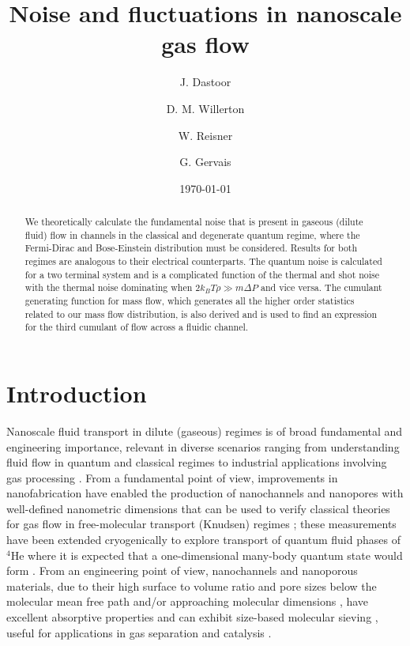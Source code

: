 \documentclass[%
 reprint,
 aps,
 prb,
 epsf,
]{revtex4-2}
\begin{document}
\title{Noise and fluctuations in nanoscale gas flow}%

\author{J. Dastoor}
\author{D. M. Willerton}
\author{W. Reisner}
\author{G. Gervais}


%

\date{\today}

\begin{abstract}
We theoretically calculate the fundamental noise that is present in gaseous (dilute fluid) flow in channels in the classical and degenerate quantum regime, where the Fermi-Dirac and Bose-Einstein distribution must be considered. Results for both regimes are analogous to their electrical counterparts. The quantum noise is calculated for a two terminal system and is a complicated function of the thermal and shot noise with the thermal noise dominating when $2k_BT\rho \gg m\Delta P$ and vice versa. The cumulant generating function for mass flow, which generates all the higher order statistics related to our mass flow distribution, is also derived and is used to find an expression for the third cumulant of flow across a fluidic channel.
\end{abstract}
\maketitle
{}


\section{\label{sec:intro}Introduction}

     Nanoscale fluid transport in dilute (gaseous) regimes is of broad fundamental and engineering importance, relevant in diverse scenarios ranging from understanding fluid flow in quantum and classical regimes to industrial applications involving gas processing \cite{bao}.  From a fundamental point of view, improvements in nanofabrication have enabled the production of nanochannels and nanopores with well-defined nanometric dimensions that can be used to verify classical theories for gas flow in free-molecular transport (Knudsen) regimes \cite{huber,savard,velasco}; these measurements have been extended cryogenically to explore transport of quantum fluid phases of $^4$He \cite{gervaispore4He} where it is expected that a one-dimensional many-body quantum state would form \cite{gervaispore4He2}.   From an engineering point of view, nanochannels and nanoporous materials, due to their high surface to volume ratio and pore sizes below the molecular mean free path and/or approaching molecular dimensions \cite{wang}, have excellent absorptive properties and can exhibit size-based molecular sieving \cite{wang,Geim, Ding}, useful for applications in gas separation \cite{Ding} and catalysis \cite{Li}.\\
     
\end{document}
